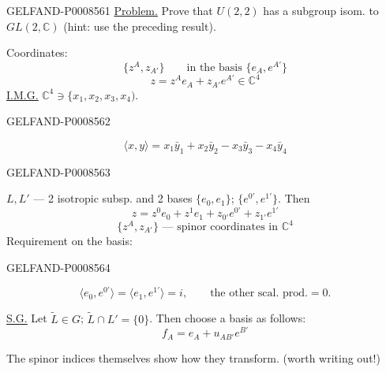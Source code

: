 \begin{GelfandAdjacentEvidence}{GELFAND-P000856}{1}
\uline{Problem.} Prove that \(U(2,2)\) has a subgroup isom. to \(GL(2,\mathbb{C})\)
(hint: use the preceding result).

Coordinates:
\[
\{z^A,z_{A'}\}\qquad\text{in the basis }\{e_A,e^{A'}\}\tag{10}
\]
\[
z=z^Ae_A+z_{A'}e^{A'}\in\mathbb C^4\tag{11}
\]
\uline{\uline{I.M.G.}} \(\mathbb C^4\ni\lbrace x_1,x_2,x_3,x_4)\).
\end{GelfandAdjacentEvidence}
\begin{GelfandAdjacentEvidence}{GELFAND-P000856}{2}

\[
\langle x,y\rangle=x_1\bar y_1+x_2\bar y_2-x_3\bar y_3-x_4\bar y_4\tag{12}
\]
\end{GelfandAdjacentEvidence}
\begin{GelfandAdjacentEvidence}{GELFAND-P000856}{3}

\(L,L'\) — 2 isotropic subsp. and 2 bases \(\{e_0,e_1\}\); \(\{e^{0'},e^{1'}\}\).
Then
\[
z=z^0e_0+z^1e_1+z_{0'}e^{0'}+z_{1'}e^{1'}\tag{13}
\]
\[
\{z^A,z_{A'}\}\text{ — spinor coordinates in }\mathbb C^4\tag{14}
\]
Requirement on the basis:
\end{GelfandAdjacentEvidence}
\begin{GelfandAdjacentEvidence}{GELFAND-P000856}{4}

\[
\langle e_0,e^{0'}\rangle=\langle e_1,e^{1'}\rangle=i,
\qquad\text{the other scal. prod.}=0.\tag{15}
\]

\uline{\uline{S.G.}} Let \(\widetilde L\in G\); \(\widetilde L\cap L'=\{0\}\).
Then choose a basis as follows:
\[
f_A=e_A+u_{AB'}e^{B'}\tag{16}
\]
\end{GelfandAdjacentEvidence}

The spinor indices themselves show how they transform. (worth writing out!)

